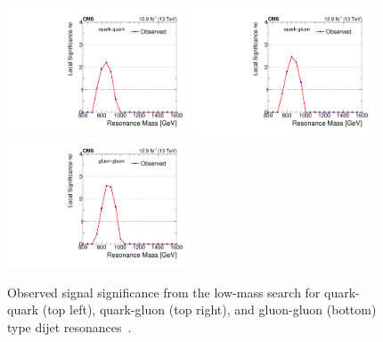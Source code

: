 \begin{figure}[hbtp]
  \centering
    \includegraphics[width=0.48\textwidth]{figs/dijet/signif_qq_calodijet2016.pdf}
    \includegraphics[width=0.48\textwidth]{figs/dijet/signif_qg_calodijet2016.pdf}
    \includegraphics[width=0.48\textwidth]{figs/dijet/signif_gg_calodijet2016.pdf}
    \caption{Observed signal significance from the low-mass search for
      quark-quark (top left), quark-gluon (top right), and gluon-gluon
      (bottom) type dijet resonances~\cite{jmgd}.}
    \label{figSignifLow}
\end{figure}

